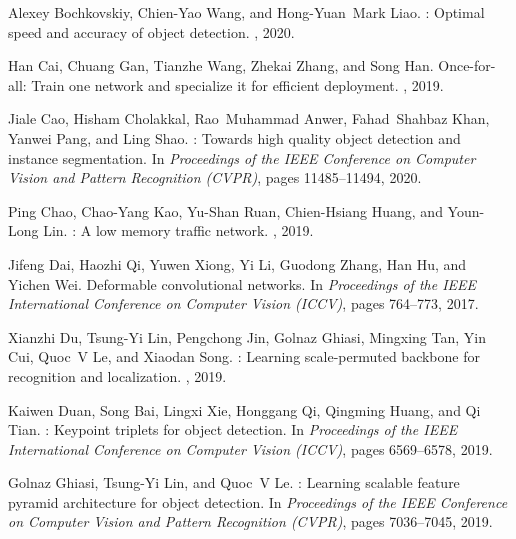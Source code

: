 \documentclass[10pt,twocolumn,letterpaper]{article}
\begin{document}
\clearpage
\clearpage
\clearpage
{\small
\begin{thebibliography}{10}\itemsep=-1pt
	
	Alexey Bochkovskiy, Chien-Yao Wang, and Hong-Yuan~Mark Liao.
	: Optimal speed and accuracy of object detection.
	, 2020.
	
	Han Cai, Chuang Gan, Tianzhe Wang, Zhekai Zhang, and Song Han.
	\newblock Once-for-all: Train one network and specialize it for efficient
	deployment.
	, 2019.
	
	Jiale Cao, Hisham Cholakkal, Rao~Muhammad Anwer, Fahad~Shahbaz Khan, Yanwei
	Pang, and Ling Shao.
	: Towards high quality object detection and instance
	segmentation.
	\newblock In {\em Proceedings of the IEEE Conference on Computer Vision and
		Pattern Recognition (CVPR)}, pages 11485--11494, 2020.
	
	Ping Chao, Chao-Yang Kao, Yu-Shan Ruan, Chien-Hsiang Huang, and Youn-Long Lin.
	: A low memory traffic network.
	, 2019.
	
	Jifeng Dai, Haozhi Qi, Yuwen Xiong, Yi Li, Guodong Zhang, Han Hu, and Yichen
	Wei.
	\newblock Deformable convolutional networks.
	\newblock In {\em Proceedings of the IEEE International Conference on Computer
		Vision (ICCV)}, pages 764--773, 2017.
	
	Xianzhi Du, Tsung-Yi Lin, Pengchong Jin, Golnaz Ghiasi, Mingxing Tan, Yin Cui,
	Quoc~V Le, and Xiaodan Song.
	: Learning scale-permuted backbone for recognition and
	localization.
	, 2019.
	
	Kaiwen Duan, Song Bai, Lingxi Xie, Honggang Qi, Qingming Huang, and Qi Tian.
	: Keypoint triplets for object detection.
	\newblock In {\em Proceedings of the IEEE International Conference on Computer
		Vision (ICCV)}, pages 6569--6578, 2019.
	
	Golnaz Ghiasi, Tsung-Yi Lin, and Quoc~V Le.
	: Learning scalable feature pyramid architecture for object
	detection.
	\newblock In {\em Proceedings of the IEEE Conference on Computer Vision and
		Pattern Recognition (CVPR)}, pages 7036--7045, 2019.
	

\end{thebibliography}}
\end{document}
